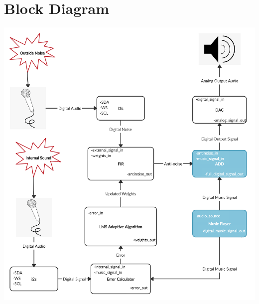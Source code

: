 \documentclass[12pt]{article}
\begin{document}
\section{Block Diagram}

\includegraphics[width=\textwidth]{docs/proposal/images/Proposal Block Diagram.png}


\newpage
\end{document}
